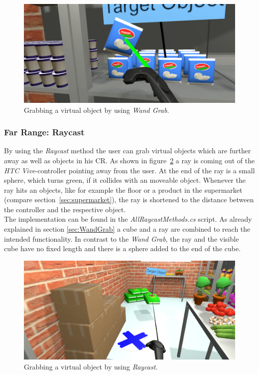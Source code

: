 \begin{figure}[H] 
	\center 
	\includegraphics[width=12cm]{Images/WandGrab.PNG}			
	\caption[Grabbing a virtual object by using \textit{Wand Grab}.]{Grabbing a virtual object by using \textit{Wand Grab}.}
	\label{fig:wandGrab}
\end{figure}

\subsubsection{Far Range: Raycast} \label{sec:Raycast}
By using the \textit{Raycast} method the user can grab virtual objects which are further away as well as objects in his CR. As shown in figure~\ref{fig:raycast} a ray is coming out of the \textit{HTC Vive}-controller pointing away from the user. At the end of the ray is a small sphere, which turns green, if it collides with an moveable object. Whenever the ray hits an objects, like for example the floor or a product in the supermarket (compare section~\ref{sec:supermarket}), the ray is shortened to the distance between the controller and the respective object. \\
The implementation can be found in the \textit{AllRaycastMethods.cs} script. As already explained in section \ref{sec:WandGrab} a cube and a ray are combined to reach the intended functionality. In contrast to the \textit{Wand Grab}, the ray and the visible cube have no fixed length and there is a sphere added to the end of the cube.

\begin{figure}[H] 
	\center 
	\includegraphics[width=12cm]{Images/Raycast.PNG}			
	\caption[Grabbing a virtual object by using \textit{Raycast}.]{Grabbing a virtual object by using \textit{Raycast}.}
	\label{fig:raycast}
\end{figure}


